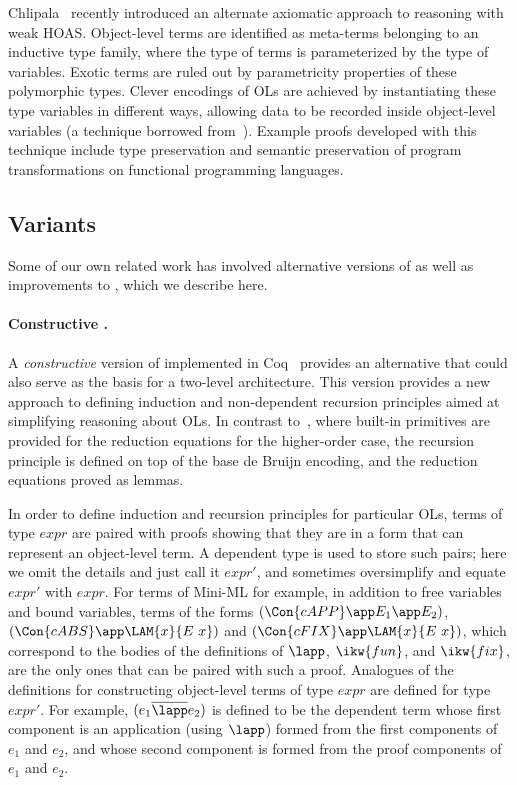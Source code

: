 \documentclass[final]{svjour3}
\begin{document}
 Chlipala~\cite{ChlipalaICFP08} recently
introduced an alternate axiomatic approach to reasoning with weak
HOAS\@.  Object-level terms are identified as meta-terms belonging to an
inductive type family, where the type of terms is parameterized by the
type of variables.  Exotic terms are ruled out by parametricity
properties of these polymorphic types.  Clever encodings of OLs are
achieved by instantiating these type variables in different ways,
allowing data to be recorded inside object-level variables (a
technique borrowed from~\cite{WashburnWeirichJFP08}).  Example proofs
developed with this technique include type preservation and semantic
preservation of program transformations on functional programming
languages.


\subsection{\hybrid Variants}
\label{ssec:h-v}

Some of our own related work has involved alternative versions of
\hybrid as well as improvements to \hybrid, which we describe here.

\paragraph{Constructive \hybrid.}



A \emph{constructive} version of \hybrid implemented in
Coq~\cite{CapFel07} provides an alternative that could also serve as
the basis for a two-level architecture.  This version provides a new
approach to defining induction and non-dependent recursion principles
aimed at simplifying reasoning about OLs.  In contrast
to~\cite{SPS:TLCA2005}, where built-in primitives are provided for the
reduction equations for the higher-order case, the recursion principle
is defined on top of the base de Bruijn encoding, and the reduction
equations proved as lemmas.

In order to define induction and recursion principles
for particular OLs, terms of type $expr$ are paired with proofs
showing that they are in a form that can represent an object-level
term.  A dependent type is used to store such pairs; here we omit the
details and just call it $expr'$, and sometimes oversimplify and
equate $expr'$ with $expr$.  For terms of Mini-ML for example, in
addition to free variables and bound variables, terms of the forms
$(\Con{cAPP} \app E_1 \app E_2)$,
$(\Con{cABS} \app \LAM{x}{E\ x})$ and
$(\Con{cFIX} \app \LAM{x}{E\ x})$,
which correspond to the bodies of the definitions of $\lapp$,
$\ikw{fun}$, and $\ikw{fix}$, are the only ones that can be
paired with such a proof.  Analogues of the definitions for
constructing object-level terms of type $expr$ are defined for type
$expr'$.  For example, $(e_1 \overline{\lapp} e_2)$ is defined to be
the dependent term whose first component is an application (using
$\lapp$) formed from the first components of $e_1$ and $e_2$, and
whose second component is formed from the proof components of $e_1$
and $e_2$.
\end{document}
